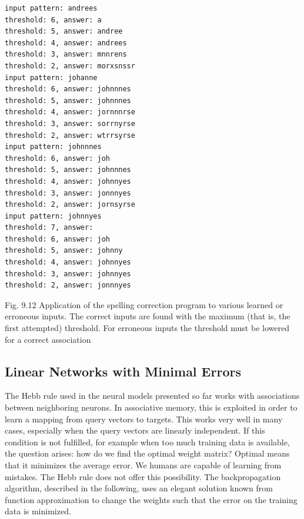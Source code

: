 \documentclass[10pt]{book}
\begin{document}
\begin{verbatim}
input pattern: andrees
threshold: 6, answer: a
threshold: 5, answer: andree
threshold: 4, answer: andrees
threshold: 3, answer: mnnrens
threshold: 2, answer: morxsnssr
input pattern: johanne
threshold: 6, answer: johnnnes
threshold: 5, answer: johnnnes
threshold: 4, answer: jornnnrse
threshold: 3, answer: sorrnyrse
threshold: 2, answer: wtrrsyrse
input pattern: johnnnes
threshold: 6, answer: joh
threshold: 5, answer: johnnnes
threshold: 4, answer: johnnyes
threshold: 3, answer: jonnnyes
threshold: 2, answer: jornsyrse
input pattern: johnnyes
threshold: 7, answer:
threshold: 6, answer: joh
threshold: 5, answer: johnny
threshold: 4, answer: johnnyes
threshold: 3, answer: johnnyes
threshold: 2, answer: jonnnyes
\end{verbatim}

Fig. 9.12 Application of the spelling correction program to various learned or erroneous inputs. The correct inputs are found with the maximum (that is, the first attempted) threshold. For erroneous inputs the threshold must be lowered for a correct association

\subsection{Linear Networks with Minimal Errors}
The Hebb rule used in the neural models presented so far works with associations between neighboring neurons. In associative memory, this is exploited in order to learn a mapping from query vectors to targets. This works very well in many cases, especially when the query vectors are linearly independent. If this condition is not fulfilled, for example when too much training data is available, the question arises: how do we find the optimal weight matrix? Optimal means that it minimizes the average error.
We humans are capable of learning from mistakes. The Hebb rule does not offer this possibility. The backpropagation algorithm, described in the following, uses an elegant solution known from function approximation to change the weights such that the error on the training data is minimized.
\end{document}
